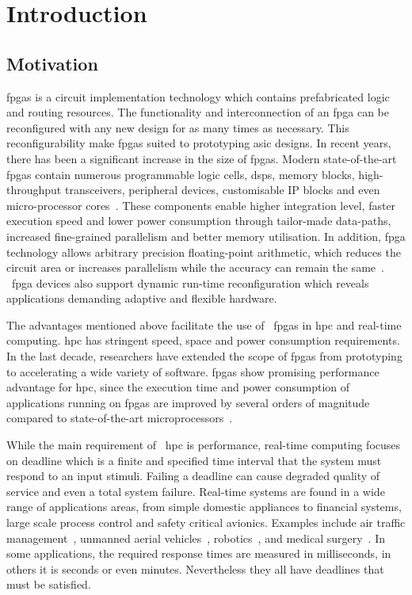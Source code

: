 
\chapter{Introduction}

\section{Motivation}

\glspl{fpga} is a circuit implementation technology which contains prefabricated logic and routing resources.
The functionality and interconnection of an \gls{fpga} can be reconfigured with any new design for as many times as necessary.
This reconfigurability make \glspl{fpga} suited to prototyping \gls{asic} designs.
In recent years, there has been a significant increase in the size of \glspl{fpga}.
Modern state-of-the-art \glspl{fpga} contain numerous programmable logic cells, \glspl{dsp}, memory blocks, high-throughput transceivers, peripheral devices, customisable IP blocks and even micro-processor cores~\cite{alterasoc,xilinxzynq}.
These components enable higher integration level, faster execution speed and lower power consumption through tailor-made data-paths, increased fine-grained parallelism and better memory utilisation.
In addition, \gls{fpga} technology allows arbitrary precision floating-point arithmetic, which reduces the circuit area or increases parallelism while the accuracy can remain the same~\cite{chow11,chow12}.
~\gls{fpga} devices also support dynamic run-time reconfiguration which reveals applications demanding adaptive and flexible hardware. 

The advantages mentioned above facilitate the use of ~\glspl{fpga} in \gls{hpc} and real-time computing.
\gls{hpc} has stringent speed, space and power consumption requirements.
In the last decade, researchers have extended the scope of \glspl{fpga} from prototyping to accelerating a wide variety of software.
\glspl{fpga} show promising performance advantage for \gls{hpc}, since the execution time and power consumption of applications running on \glspl{fpga} are improved by several orders of magnitude compared to state-of-the-art microprocessors~\cite{chow11,chow12,craven07,guo04,pell11}.

While the main requirement of ~\gls{hpc} is performance, real-time computing focuses on deadline which is a finite and specified time interval that the system must respond to an input stimuli.
Failing a deadline can cause degraded quality of service and even a total system failure.
Real-time systems are found in a wide range of applications areas, from simple domestic appliances to financial systems, large scale process control and safety critical avionics.
Examples include air traffic management~\cite{crisostomi07,eele11}, unmanned aerial vehicles~\cite{ortiz06}, robotics~\cite{dellaert99}, and medical surgery~\cite{kwok10}.
In some applications, the required response times are measured in milliseconds, in others it is seconds or even minutes. 
Nevertheless they all have deadlines that must be satisfied.

